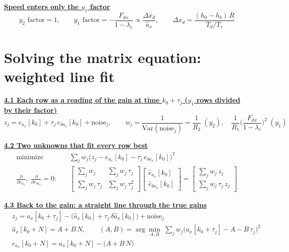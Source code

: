 \documentclass[11pt,a4paper]{ctexart}
\newcommand{\lc}{\lambda_c}
\newcommand{\hd}[1]{\par\bigskip\noindent\underline{\textbf{#1}}}
\begin{document}
\hd{Speed enters only the $y_1$ factor}
\[
y_2 \text{ factor} = 1, \qquad
y_1 \text{ factor} = -\frac{F_{dx}}{1-\lc} \propto \frac{\Delta x_d}{\hat a_x}, \qquad
\Delta x_d = \frac{(h_0 - h_b)\,R}{T_d/T_s}
\]

\clearpage
\section{Solving the matrix equation: weighted line fit}

\hd{4.1 Each row as a reading of the gain at time $k_0+\tau_j$ ($y_1$ rows divided by their factor)}
\[
z_j = e_{a_x}[k_0] + \tau_j\,e_{\delta a_x}[k_0] + \text{noise}_j, \qquad
w_j = \frac{1}{\mathrm{Var}(\text{noise}_j)} = \frac{1}{R_2} \;(y_2), \quad \frac{1}{R_1}\Big(\frac{F_{dx}}{1-\lc}\Big)^{2} \;(y_1)
\]

\hd{4.2 Two unknowns that fit every row best}
\[
\begin{aligned}
\text{minimize}\quad & \sum_j w_j\big(z_j - e_{a_x}[k_0] - \tau_j\,e_{\delta a_x}[k_0]\big)^2 \\
\frac{\partial}{\partial e_{a_x}},\;\frac{\partial}{\partial e_{\delta a_x}} = 0:\quad &
\begin{bmatrix} \sum_j w_j & \sum_j w_j\,\tau_j \\ \sum_j w_j\,\tau_j & \sum_j w_j\,\tau_j^2 \end{bmatrix}
\begin{bmatrix} \hat e_{a_x}[k_0] \\ \hat e_{\delta a_x}[k_0] \end{bmatrix}
= \begin{bmatrix} \sum_j w_j\,z_j \\ \sum_j w_j\,\tau_j\,z_j \end{bmatrix}
\end{aligned}
\]

\hd{4.3 Back to the gain: a straight line through the true gains}
\[
\begin{aligned}
&z_j = a_x[k_0+\tau_j] - \big(\hat a_x[k_0] + \tau_j\,\delta\hat a_x[k_0]\big) + \text{noise}_j \\
&\hat a_x[k_0+N] = A + B\,N, \qquad (A, B) = \arg\min_{A,B}\;\sum_j w_j\big(a_x[k_0+\tau_j] - A - B\,\tau_j\big)^2 \\
&e_{a_x}[k_0+N] = a_x[k_0+N] - \big(A + B\,N\big)
\end{aligned}
\]

\end{document}
